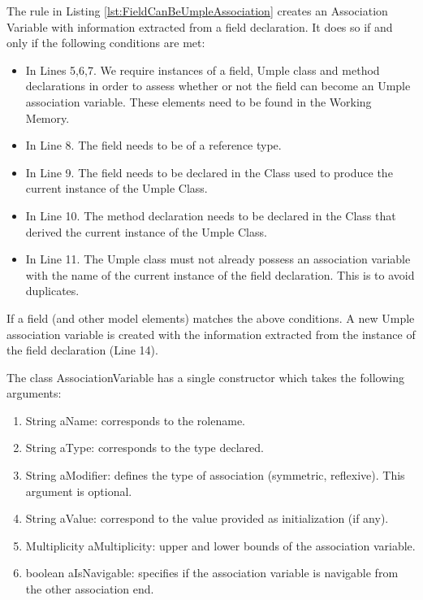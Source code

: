 The rule in Listing \ref{lst:FieldCanBeUmpleAssociation} creates an Association Variable with information extracted from a field declaration. It does so if and only if the following conditions are met:
\begin{itemize}
\item In Lines 5,6,7. We require instances of a field, Umple class and method declarations in order to assess whether or not the field can become an Umple association variable. These elements need to be found in the Working Memory. 

\item In Line 8. The field needs to be of a reference type. 

\item In Line 9. The field needs to be declared in the Class used to produce the current instance of the Umple Class.

\item In Line 10. The method declaration needs to be declared in the Class that derived the current instance of the Umple Class.

\item In Line 11. The Umple class must not already possess an association variable with the name of the current instance of the field declaration. This is to avoid duplicates.

\end{itemize}

If a field (and other model elements) matches the above conditions. A new Umple association variable is created with the information extracted from the instance of the field declaration (Line 14).

The class AssociationVariable has a single constructor which takes the following arguments:

\begin{enumerate}
\item String aName: corresponds to the rolename.
\item String aType: corresponds to the type declared.
\item String aModifier: defines the type of association (symmetric, reflexive). This argument is optional.
\item String aValue: correspond to the value provided as initialization (if any).
\item Multiplicity aMultiplicity: upper and lower bounds of the association variable.
\item boolean aIsNavigable: specifies if the association variable is navigable from the other association end.
\end{enumerate}

